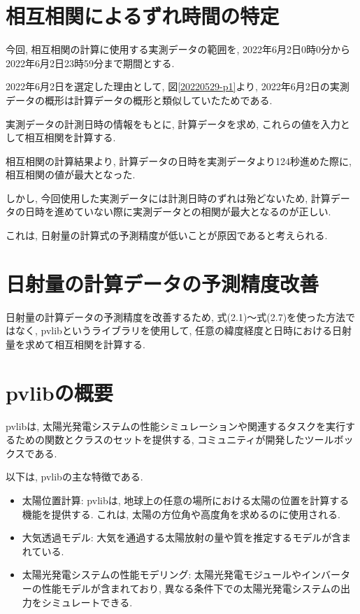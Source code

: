 
\section{相互相関によるずれ時間の特定}
今回, 相互相関の計算に使用する実測データの範囲を, 2022年6月2日0時0分から2022年6月2日23時59分まで期間とする.

2022年6月2日を選定した理由として, 図\ref{20220529-p1}より, 2022年6月2日の実測データの概形は計算データの概形と類似していたためである.

実測データの計測日時の情報をもとに, 計算データを求め, これらの値を入力として相互相関を計算する.

相互相関の計算結果より, 計算データの日時を実測データより124秒進めた際に, 相互相関の値が最大となった.

しかし, 今回使用した実測データには計測日時のずれは殆どないため, 計算データの日時を進めていない際に実測データとの相関が最大となるのが正しい.

これは, 日射量の計算式の予測精度が低いことが原因であると考えられる.

\section{日射量の計算データの予測精度改善}

日射量の計算データの予測精度を改善するため, 式(2.1)～式(2.7)を使った方法ではなく, pvlibというライブラリを使用して, 任意の緯度経度と日時における日射量を求めて相互相関を計算する.

\section{pvlibの概要}
pvlibは, 太陽光発電システムの性能シミュレーションや関連するタスクを実行するための関数とクラスのセットを提供する, コミュニティが開発したツールボックスである. 

以下は, pvlibの主な特徴である.

\begin{itemize}
  \item 太陽位置計算: pvlibは, 地球上の任意の場所における太陽の位置を計算する機能を提供する. これは, 太陽の方位角や高度角を求めるのに使用される.
  \item 大気透過モデル: 大気を通過する太陽放射の量や質を推定するモデルが含まれている.
  \item 太陽光発電システムの性能モデリング: 太陽光発電モジュールやインバーターの性能モデルが含まれており, 異なる条件下での太陽光発電システムの出力をシミュレートできる.
\end{itemize}

